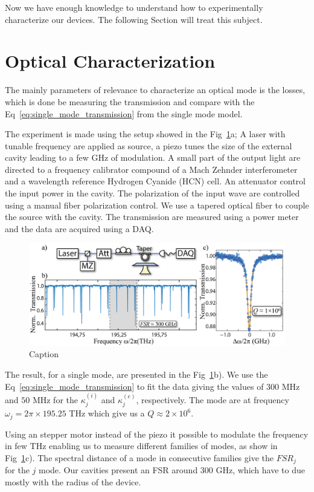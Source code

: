 Now we have enough knowledge to understand how to experimentally characterize our devices. The following Section will treat this subject. 

\section{Optical Characterization}

The mainly parameters of relevance to characterize an optical mode is the losses, which is done be measuring the transmission and compare with the Eq~\ref{eq:single_mode_transmission} from the single mode model. 

The experiment is made using the setup showed in the  Fig~\ref{fig:exp_mode_charac}a; A laser with tunable frequency are applied as source, a piezo tunes the size of the external cavity leading to a few GHz of modulation. A small part of the output light are directed to a frequency calibrator compound of a Mach Zehnder interferometer and a wavelength reference Hydrogen Cyanide (HCN) cell. An attenuator control the input power in the cavity. The polarization of the input wave are controlled using a manual fiber polarization control. We use a tapered optical fiber to couple the source with the cavity. The transmission are measured using a power meter and the data are acquired using a DAQ. 
\begin{figure}[h!]
    \centering
    \includegraphics[width = 16cm]{figuras/Dissertation_optical_char_exp.jpg}
    \caption{Caption}
    \label{fig:exp_mode_charac}
\end{figure}

The result, for a single mode, are presented in the Fig~\ref{fig:exp_mode_charac}b). We use the Eq~\ref{eq:single_mode_transmission} to fit the data giving the values of $300$ MHz and $50$ MHz for the $\kappa_j^{(i)}$ and $\kappa_j^{(e)}$, respectively. The mode are at frequency $\omega_j = 2\pi\times195.25$ THz which give us a $Q \approx 2\times10^6$.

Using an stepper motor instead of the piezo it possible to modulate the frequency in few THz enabling us to measure different families of modes, as show in Fig~\ref{fig:exp_mode_charac}c). The spectral distance of a mode in consecutive families give the $FSR_j$ for the $j$ mode. Our cavities present an FSR around $300$ GHz, which have to due mostly with the radius of the device. 

